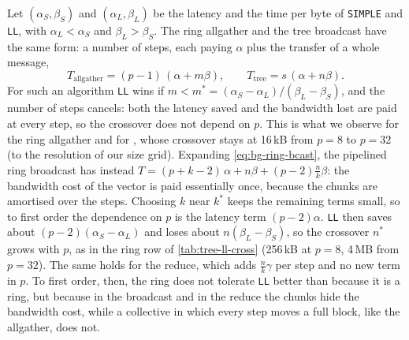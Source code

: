 Let $(\alpha_S,\beta_S)$ and $(\alpha_L,\beta_L)$ be the latency and the time per byte of \texttt{SIMPLE} and \texttt{LL}, with $\alpha_L<\alpha_S$ and $\beta_L>\beta_S$.
The ring allgather and the tree broadcast have the same form: a number of steps, each paying $\alpha$ plus the transfer of a whole message,
\begin{equation}
  T_{\text{allgather}}=(p-1)\,(\alpha+m\beta),\qquad T_{\text{tree}}=s\,(\alpha+n\beta).
\end{equation}
For such an algorithm \texttt{LL} wins if $m<m^\ast=(\alpha_S-\alpha_L)/(\beta_L-\beta_S)$, and the number of steps cancels: both the latency saved and the bandwidth lost are paid at every step, so the crossover does not depend on $p$.
This is what we observe for the ring allgather and for \bine{}, whose crossover stays at 16\,kB from $p=8$ to $p=32$ (to the resolution of our size grid).
Expanding \cref{eq:bg-ring-bcast}, the pipelined ring broadcast has instead $T=(p+k-2)\,\alpha+n\beta+(p-2)\tfrac{n}{k}\beta$: the bandwidth cost of the vector is paid essentially once, because the chunks are amortised over the steps. Choosing $k$ near $k^\ast$ keeps the remaining terms small, so to first order the dependence on $p$ is the latency term $(p-2)\alpha$.
\texttt{LL} then saves about $(p-2)(\alpha_S-\alpha_L)$ and loses about $n(\beta_L-\beta_S)$, so the crossover $n^\ast$ grows with $p$, as in the ring row of \cref{tab:tree-ll-cross} (256\,kB at $p=8$, 4\,MB from $p=32$).
The same holds for the reduce, which adds $\tfrac{n}{k}\gamma$ per step and no new term in $p$.
To first order, then, the ring does not tolerate \texttt{LL} better than \bine{} because it is a ring, but because in the broadcast and in the reduce the chunks hide the bandwidth cost, while a collective in which every step moves a full block, like the allgather, does not.

